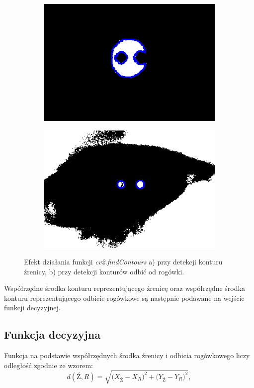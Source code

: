 \begin{figure}[h!]
  \begin{subfigure}[h!]{0.3\textwidth}\subcaption{\label{fig11a}}
    \centering
    \includegraphics[scale=0.48]{images/11.png}
  \end{subfigure}\hspace{2.5cm}
  \begin{subfigure}[h!]{0.3\textwidth}\subcaption{\label{fig11b}}
    \centering
    \includegraphics[scale=0.48]{images/13.png}
  \end{subfigure}
  \caption{Efekt działania funkcji \textit{cv2.findContours} {a)} przy detekcji konturu źrenicy, {b)} przy detekcji konturów odbić od rogówki. \label{fig11}}
\end{figure}

Współrzędne środka konturu reprezentującego źrenicę oraz współrzędne środka konturu reprezentującego odbicie rogówkowe są następnie podawane na wejście funkcji decyzyjnej.
\subsection{Funkcja decyzyjna}
Funkcja na podstawie współrzędnych środka źrenicy i odbicia rogówkowego liczy odległość zgodnie ze wzorem:
\begin{equation}
  d(\textit{Ź},R) = \sqrt{\Big(X_{\textit{Ź}} - X_{R}\Big)^{2} + \Big(Y_{\textit{Ź}} - Y_{R}\Big)^{2}},
\end{equation}

